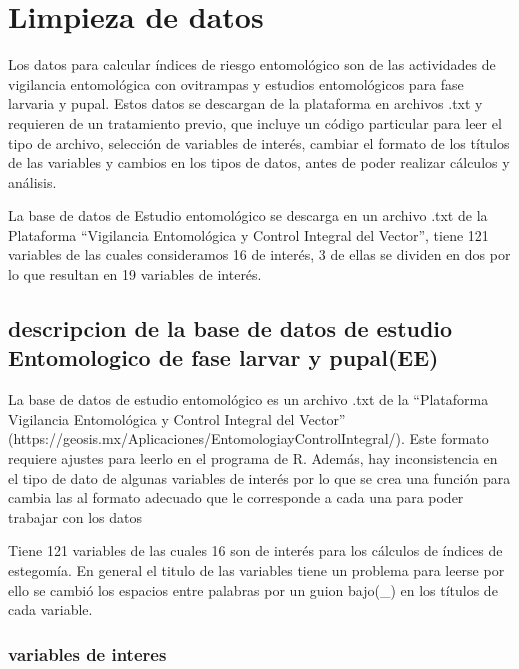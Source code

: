 \documentclass[
  letterpaper,
  twocolumn,
  landscape]{report}
\begin{document}

\chapter{Limpieza de datos}\label{limpieza-de-datos}

Los datos para calcular índices de riesgo entomológico son de las
actividades de vigilancia entomológica con ovitrampas y estudios
entomológicos para fase larvaria y pupal. Estos datos se descargan de la
plataforma en archivos .txt y requieren de un tratamiento previo, que
incluye un código particular para leer el tipo de archivo, selección de
variables de interés, cambiar el formato de los títulos de las variables
y cambios en los tipos de datos, antes de poder realizar cálculos y
análisis.

La base de datos de Estudio entomológico se descarga en un archivo .txt
de la Plataforma ``Vigilancia Entomológica y Control Integral del
Vector'', tiene 121 variables de las cuales consideramos 16 de interés,
3 de ellas se dividen en dos por lo que resultan en 19 variables de
interés.

\section{descripcion de la base de datos de estudio Entomologico de fase
larvar y
pupal(EE)}\label{descripcion-de-la-base-de-datos-de-estudio-entomologico-de-fase-larvar-y-pupalee}

La base de datos de estudio entomológico es un archivo .txt de la
``Plataforma Vigilancia Entomológica y Control Integral del Vector''
(https://geosis.mx/Aplicaciones/EntomologiayControlIntegral/). Este
formato requiere ajustes para leerlo en el programa de R. Además, hay
inconsistencia en el tipo de dato de algunas variables de interés por lo
que se crea una función para cambia las al formato adecuado que le
corresponde a cada una para poder trabajar con los datos

Tiene 121 variables de las cuales 16 son de interés para los cálculos de
índices de estegomía. En general el titulo de las variables tiene un
problema para leerse por ello se cambió los espacios entre palabras por
un guion bajo(\_) en los títulos de cada variable.

\subsection*{variables de interes}\label{variables-de-interes}
\end{document}
